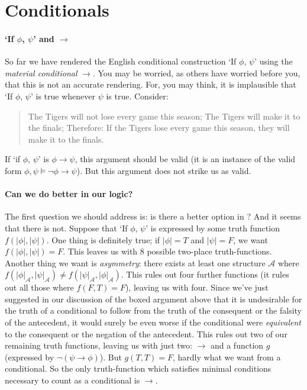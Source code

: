 

\section{Conditionals}

\paragraph{`If $\phi$, $\psi$' and $\to$}
So far we have rendered the English conditional construction `If $\phi$, $\psi$' using the \emph{material conditional} $\to$. You may be worried, as others have worried before you, that this is not an accurate rendering. For, you may think, it is implausible that `If $\phi$, $\psi$' is true whenever $\psi$ is true. Consider: 
\begin{quote}
	\begin{exe}
	\ex The Tigers  will not lose every game this season;
	\ex The Tigers will make it to the finals;
	\ex Therefore: If the Tigers lose every game this season, they will make it to the finals.
 \end{exe}
\end{quote}
If `if $\phi$, $\psi$' is $\phi \to \psi$, this argument should be valid (it is an instance of the valid form $\phi,\psi \vDash \neg\phi \to \psi$). But this argument does not strike us as valid. 

\paragraph{Can we do better in our logic?}
The first question we should address is: is there a better option in \lone? And it seems that there is not. Suppose that `If $\phi$, $\psi$' is expressed by some truth function $f(|\phi|,|\psi|)$. One thing is definitely true; if $|\phi|=T$ and $|\psi|=F$, we want $f(|\phi|,|\psi|)=F$. This leaves us with 8 possible two-place truth-functions. Another thing we want is \emph{asymmetry}: there exists at least one structure $\mathscr{A}$ where $f(|\phi|_{\mathscr{A}},|\psi|_{\mathscr{A}})\neq f(|\psi|_{\mathscr{A}},|\phi|_{\mathscr{A}})$. This rules out four further functions (it rules out all those where $f(F,T)=F$), leaving us with four. Since we've just suggested in our discussion of the boxed argument above that it is undesirable for the truth of a conditional to follow from the truth of the consequent or the falsity of the antecedent, it would surely be even worse if the conditional were \emph{equivalent} to the consequent or the negation of the antecedent. This rules out two of our remaining truth functions, leaving us with just two: $\to$ and a function $g$ (expressed by $\neg(\psi\to\phi)$). But $g(T,T)=F$, hardly what we want from a conditional. So the only truth-function which satisfies minimal conditions necessary to count as a conditional is $\to$.

